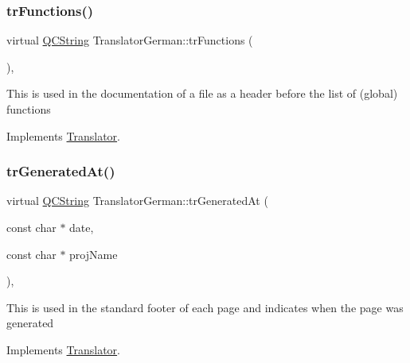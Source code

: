 \mbox{\label{class_translator_german_a89f8679af21cf2ca2f38336493cc9747}} 
\subsubsection{\texorpdfstring{trFunctions()}{trFunctions()}}
{\footnotesize\ttfamily virtual \mbox{\hyperlink{class_q_c_string}{Q\+C\+String}} Translator\+German\+::tr\+Functions (\begin{DoxyParamCaption}{ }\end{DoxyParamCaption})\hspace{0.3cm}{\ttfamily [inline]}, {\ttfamily [virtual]}}

This is used in the documentation of a file as a header before the list of (global) functions 

Implements \mbox{\hyperlink{class_translator}{Translator}}.

\mbox{\label{class_translator_german_a8bc7a78e21c44d0d9c9d315c5026a3f5}} 
\subsubsection{\texorpdfstring{trGeneratedAt()}{trGeneratedAt()}}
{\footnotesize\ttfamily virtual \mbox{\hyperlink{class_q_c_string}{Q\+C\+String}} Translator\+German\+::tr\+Generated\+At (\begin{DoxyParamCaption}\item[{const char $\ast$}]{date,  }\item[{const char $\ast$}]{proj\+Name }\end{DoxyParamCaption})\hspace{0.3cm}{\ttfamily [inline]}, {\ttfamily [virtual]}}

This is used in the standard footer of each page and indicates when the page was generated 

Implements \mbox{\hyperlink{class_translator}{Translator}}.

\mbox{\label{class_translator_german_a70c01aff8b9180bc0c68c122ff590be9}} 
